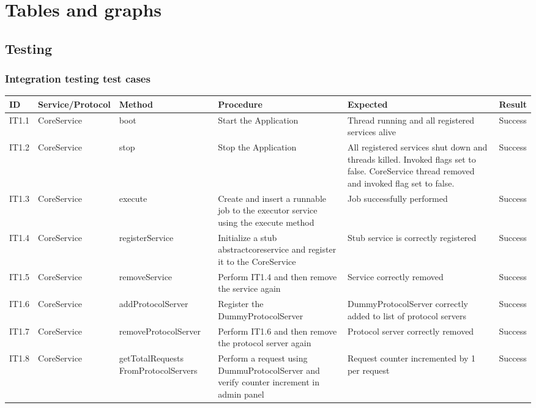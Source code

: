 \chapter{Tables and graphs}

\section{Testing}

\subsection{Integration testing test cases}

\begin{table}[ht!]
\tiny
\begin{tabular}{|m{0.5cm}|m{1.5cm}|m{1.5cm}|m{3cm}|m{3cm}|m{1.5cm}|}
\hline
\textbf{ID} & \textbf{Service/Protocol} & \textbf{Method} & \textbf{Procedure} & \textbf{Expected} & \textbf{Result}\\ \hline
IT1.1 & CoreService & boot & Start the Application & Thread running and all registered services alive & Success \\ \hline
IT1.2 & CoreService & stop & Stop the Application & All registered services shut down and threads killed. Invoked flags set to false. CoreService thread removed and invoked flag set to false. & Success \\ \hline
IT1.3 &CoreService & execute & Create and insert a runnable job to the executor service using the execute method & Job successfully performed & Success \\ \hline
IT1.4 & CoreService & registerService & Initialize a stub abstractcoreservice and register it to the CoreService & Stub service is correctly registered & Success \\ \hline
IT1.5 & CoreService & removeService & Perform IT1.4 and then remove the service again & Service correctly removed & Success \\ \hline
IT1.6 & CoreService & addProtocolServer & Register the DummyProtocolServer & DummyProtocolServer correctly added to list of protocol servers & Success \\ \hline
IT1.7 & CoreService & removeProtocolServer & Perform IT1.6 and then remove the protocol server again & Protocol server correctly removed & Success \\ \hline
IT1.8 & CoreService & getTotalRequests FromProtocolServers & Perform a request using DummuProtocolServer and verify counter increment in admin panel & Request counter incremented by 1 per request & Success \\ \hline

\end{tabular}
\end{table}
